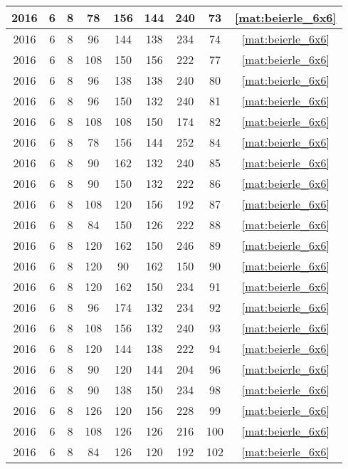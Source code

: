 \begin{longtable}{|c|c|c|c|c|c|c|c|c|}
2016 & 6 & 8 & 78 & 156 & 144 & 240 & 73 & \eqref{mat:beierle_6x6} \\ \hline 
2016 & 6 & 8 & 96 & 144 & 138 & 234 & 74 & \eqref{mat:beierle_6x6} \\ \hline 
2016 & 6 & 8 & 108 & 150 & 156 & 222 & 77 & \eqref{mat:beierle_6x6} \\ \hline 
2016 & 6 & 8 & 96 & 138 & 138 & 240 & 80 & \eqref{mat:beierle_6x6} \\ \hline 
2016 & 6 & 8 & 96 & 150 & 132 & 240 & 81 & \eqref{mat:beierle_6x6} \\ \hline 
2016 & 6 & 8 & 108 & 108 & 150 & 174 & 82 & \eqref{mat:beierle_6x6} \\ \hline 
2016 & 6 & 8 & 78 & 156 & 144 & 252 & 84 & \eqref{mat:beierle_6x6} \\ \hline 
2016 & 6 & 8 & 90 & 162 & 132 & 240 & 85 & \eqref{mat:beierle_6x6} \\ \hline 
2016 & 6 & 8 & 90 & 150 & 132 & 222 & 86 & \eqref{mat:beierle_6x6} \\ \hline 
2016 & 6 & 8 & 108 & 120 & 156 & 192 & 87 & \eqref{mat:beierle_6x6} \\ \hline 
2016 & 6 & 8 & 84 & 150 & 126 & 222 & 88 & \eqref{mat:beierle_6x6} \\ \hline 
2016 & 6 & 8 & 120 & 162 & 150 & 246 & 89 & \eqref{mat:beierle_6x6} \\ \hline 
2016 & 6 & 8 & 120 & 90 & 162 & 150 & 90 & \eqref{mat:beierle_6x6} \\ \hline 
2016 & 6 & 8 & 120 & 162 & 150 & 234 & 91 & \eqref{mat:beierle_6x6} \\ \hline 
2016 & 6 & 8 & 96 & 174 & 132 & 234 & 92 & \eqref{mat:beierle_6x6} \\ \hline 
2016 & 6 & 8 & 108 & 156 & 132 & 240 & 93 & \eqref{mat:beierle_6x6} \\ \hline 
2016 & 6 & 8 & 120 & 144 & 138 & 222 & 94 & \eqref{mat:beierle_6x6} \\ \hline 
2016 & 6 & 8 & 90 & 120 & 144 & 204 & 96 & \eqref{mat:beierle_6x6} \\ \hline 
2016 & 6 & 8 & 90 & 138 & 150 & 234 & 98 & \eqref{mat:beierle_6x6} \\ \hline 
2016 & 6 & 8 & 126 & 120 & 156 & 228 & 99 & \eqref{mat:beierle_6x6} \\ \hline 
2016 & 6 & 8 & 108 & 126 & 126 & 216 & 100 & \eqref{mat:beierle_6x6} \\ \hline 
2016 & 6 & 8 & 84 & 126 & 120 & 192 & 102 & \eqref{mat:beierle_6x6} \\ \hline 

\end{longtable}

